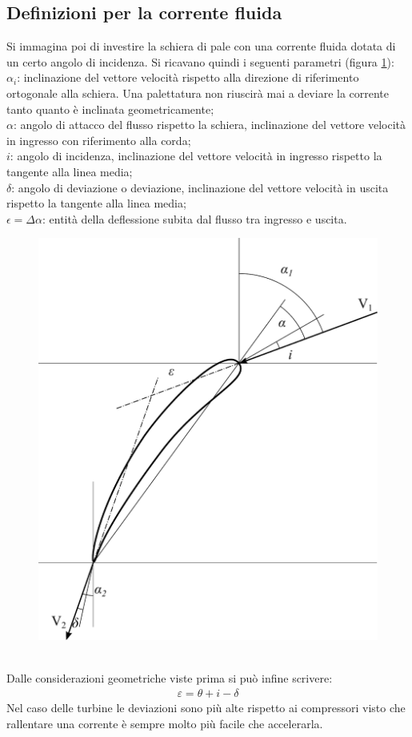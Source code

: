 \subsection{Definizioni per la corrente fluida}
Si immagina poi di investire la schiera di pale con una corrente fluida dotata di un certo angolo di incidenza. Si ricavano quindi i seguenti parametri (figura \ref{fig:palasing}):\\[1mm]
$\alpha_i$: inclinazione del vettore velocità rispetto alla direzione di riferimento ortogonale alla schiera. Una palettatura non riuscirà mai a deviare la corrente tanto quanto è inclinata geometricamente;\\
$\alpha$: angolo di attacco del flusso rispetto la schiera, inclinazione del vettore velocità in ingresso con riferimento alla corda;\\
$i$: angolo di incidenza, inclinazione del vettore velocità in ingresso rispetto la tangente alla linea media;\\
$\delta$: angolo di deviazione o deviazione, inclinazione del vettore velocità in uscita rispetto la tangente alla linea media;\\
$\epsilon = \Delta \alpha$: entità della deflessione subita dal flusso tra ingresso e uscita.\\[2mm]
\begin{figure}
\centering
  \includegraphics[width=.45\textwidth]{fig/palasing.pdf}
\caption{}
\label{fig:palasing}
\end{figure}
\\Dalle considerazioni geometriche viste prima si può infine scrivere:
\begin{align*}
\varepsilon = \theta + i - \delta
\end{align*}
Nel caso delle turbine le deviazioni sono più alte rispetto ai compressori visto che rallentare una corrente è sempre molto più facile che accelerarla.
